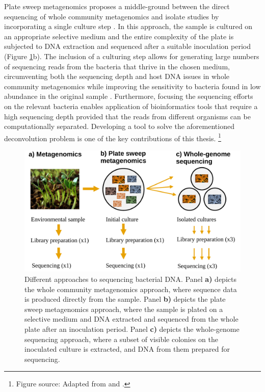 \documentclass[officiallayout]{tktla}
\let\svthefootnote\thefootnote
\begin{document}
Plate sweep metagenomics proposes a middle-ground between the direct
sequencing of whole community metagenomics and isolate studies by incorporating a
single culture step \citep{maklin_high-resolution_2021}. In this
approach, the sample is cultured on an appropriate selective medium
and the entire complexity of the plate is subjected to DNA extraction
and sequenced after a suitable inoculation period (Figure
\ref{fig:microbiome-sampling-methods}b). The inclusion of a culturing
step allows for generating large numbers of sequencing reads from the
bacteria that thrive in the chosen medium, circumventing both the
sequencing depth and host DNA issues in whole community metagenomics while
improving the sensitivity to bacteria found in low abundance in the
original sample \citep{whelan2020culture,
  tonkin-hill_pneumococcal_2022, zhang2022using}. Furthermore, focusing the sequencing
efforts on the relevant bacteria enables application of bioinformatics
tools that require a high sequencing depth provided that the reads
from different organisms can be computationally separated. Developing
a tool to solve the aforementioned deconvolution problem is one of the
key contributions of this thesis.
\noindent\let\thefootnote\relax\footnote{Figure source: Adapted from \cite{miansari_fenugreek-sprouts} and \cite{niaid_escherichia-coli}.}
\addtocounter{footnote}{-1}\let\thefootnote\svthefootnote
\begin{figure}[!t]
    \centering
    \includegraphics[width=\textwidth,keepaspectratio]{img/sampling/microbiome_sampling_methods.pdf}
    \caption{Different approaches to sequencing bacterial DNA. Panel
      \textbf{a)} depicts the whole community metagenomics approach, where
      sequence data is produced directly from the sample. Panel
      \textbf{b)} depicts the plate sweep metagenomics approach, where
      the sample is plated on a selective medium and DNA extracted and
      sequenced from the whole plate after an inoculation
      period. Panel \textbf{c)} depicts the whole-genome sequencing
      approach, where a subset of visible colonies on the inoculated
      culture is extracted, and DNA from them prepared for
      sequencing.}
    \label{fig:microbiome-sampling-methods}
\end{figure}
\end{document}
